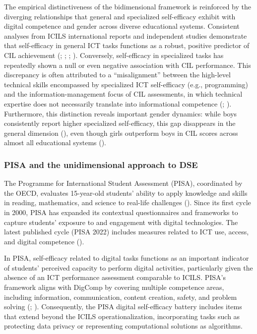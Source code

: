 \documentclass[
  letterpaper,
  DIV=11,
  numbers=noendperiod]{scrartcl}
\begin{document}
The empirical distinctiveness of the bidimensional framework is
reinforced by the diverging relationships that general and specialized
self-efficacy exhibit with digital competence and gender across diverse
educational systems. Consistent analyses from ICILS international
reports and independent studies demonstrate that self-efficacy in
general ICT tasks functions as a robust, positive predictor of CIL
achievement (;
;
;
). Conversely,
self-efficacy in specialized tasks has repeatedly shown a null or even
negative association with CIL performance. This discrepancy is often
attributed to a ``misalignment'' between the high-level technical skills
encompassed by specialized ICT self-efficacy (e.g., programming) and the
information-management focus of CIL assessments, in which technical
expertise does not necessarily translate into informational competence
(;
). Furthermore,
this distinction reveals important gender dynamics: while boys
consistently report higher specialized self-efficacy, this gap
disappears in the general dimension
(), even
though girls outperform boys in CIL scores across almost all educational
systems ().

\subsubsection{PISA and the unidimensional approach to
DSE}\label{pisa-and-the-unidimensional-approach-to-dse}

The Programme for International Student Assessment (PISA), coordinated
by the OECD, evaluates 15-year-old students' ability to apply knowledge
and skills in reading, mathematics, and science to real-life challenges
(). Since its first cycle in
2000, PISA has expanded its contextual questionnaires and frameworks to
capture students' exposure to and engagement with digital technologies.
The latest published cycle (PISA 2022) includes measures related to ICT
use, access, and digital competence ().

In PISA, self-efficacy related to digital tasks functions as an
important indicator of students' perceived capacity to perform digital
activities, particularly given the absence of an ICT performance
assessment comparable to ICILS. PISA's framework aligns with DigComp by
covering multiple competence areas, including information,
communication, content creation, safety, and problem solving
(;
). Consequently, the PISA
digital self-efficacy battery includes items that extend beyond the
ICILS operationalization, incorporating tasks such as protecting data
privacy or representing computational solutions as algorithms.
\end{document}
